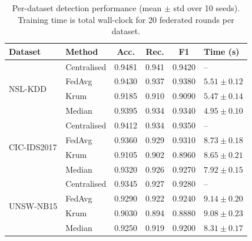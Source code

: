 \documentclass[conference]{IEEEtran}
\begin{document}
\begin{table}[htbp]
\centering
\caption{Per-dataset detection performance (mean $\pm$ std over 10 seeds).
Training time is total wall-clock for 20 federated rounds per dataset.}
\label{tab:results}
\setlength{\tabcolsep}{3pt}
\begin{tabular}{llcccl}
\toprule
\textbf{Dataset} & \textbf{Method} & \textbf{Acc.} &
  \textbf{Rec.} & \textbf{F1} & \textbf{Time (s)} \\
\midrule
\multirow{4}{*}{NSL-KDD}
  & Centralised & 0.9481 & 0.941 & 0.9420 & -- \\
  & FedAvg      & 0.9430 & 0.937 & 0.9380 & $5.51 \pm 0.12$ \\
  & Krum        & 0.9185 & 0.910 & 0.9090 & $5.47 \pm 0.14$ \\
  & Median      & 0.9395 & 0.934 & 0.9340 & $4.95 \pm 0.10$ \\
\midrule
\multirow{4}{*}{CIC-IDS2017}
  & Centralised & 0.9412 & 0.934 & 0.9350 & -- \\
  & FedAvg      & 0.9360 & 0.929 & 0.9310 & $8.73 \pm 0.18$ \\
  & Krum        & 0.9105 & 0.902 & 0.8960 & $8.65 \pm 0.21$ \\
  & Median      & 0.9320 & 0.926 & 0.9270 & $7.92 \pm 0.15$ \\
\midrule
\multirow{4}{*}{UNSW-NB15}
  & Centralised & 0.9345 & 0.927 & 0.9280 & -- \\
  & FedAvg      & 0.9290 & 0.922 & 0.9240 & $9.14 \pm 0.20$ \\
  & Krum        & 0.9030 & 0.894 & 0.8880 & $9.08 \pm 0.23$ \\
  & Median      & 0.9250 & 0.919 & 0.9200 & $8.31 \pm 0.17$ \\
\bottomrule
\end{tabular}
\end{table}
\end{document}
